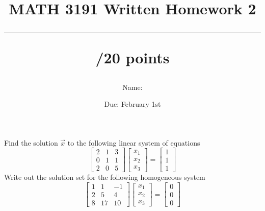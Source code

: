 \documentclass{exam}
\title{MATH 3191 Written Homework 2\\\rule{30pt}{1pt}/20 points}
\author{Name: \rule{150pt}{1pt}}
\date{Due: February 1st}
\begin{document}
\maketitle
\begin{questions}
\question[10]
    Find the solution $\vec{x}$ to the following linear system of equations
    \[
        \begin{bmatrix}
            2 & 1 & 3\\
            0 & 1 & 1\\
            2 & 0 & 5
        \end{bmatrix}\begin{bmatrix}
            x_1 \\ x_2 \\ x_3
        \end{bmatrix} = \begin{bmatrix}
            1\\1\\1
        \end{bmatrix}
    \]
    \newpage
\question[10]
    Write out the solution set for the following homogeneous system
    \[
        \begin{bmatrix}
            1 & 1 & -1\\
            2 & 5 & 4\\
            8 & 17 & 10
        \end{bmatrix}\begin{bmatrix}
            x_1\\x_2\\x_3
        \end{bmatrix} = \begin{bmatrix}
        0\\0\\0
        \end{bmatrix}
    \]
\end{questions}
\end{document}
